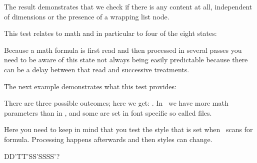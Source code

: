 \typebuffer[option=TEX]

The result demonstrates that we check if there is any content at all, independent
of dimensions or the presence of a wrapping list node.

\startlines
\getbuffer
\stoplines

\stopsectionlevel

\startsectionlevel[title={\tex{ifcramped}}]

This test relates to math and in particular to four of the eight states:

\startbuffer
{}
\stopbuffer

\typebuffer[option=TEX]

Because a math formula is first read and then processed in several passes you
need to be aware of this state not always being easily predictable because there
can be a delay between that read and successive treatments.

\startlinecorrection
\scale[s=2]{\showglyphs\getbuffer}
\stoplinecorrection

\stopsectionlevel

\startsectionlevel[title={\tex{ifmathparameter}}]

The next example demonstrates what this test provides:

\stopbuffer

\typebuffer[option=TEX]

There are three possible outcomes; here we get: \inlinebuffer. In \LUAMETATEX\ we
have more math parameters than in \LUATEX, and some are set in font specific so
called  files.

\stopsectionlevel

\startsectionlevel[title={\tex{ifmathstyle}}]

Here you need to keep in mind that you test the style that is set when \TEX\ scans for
formula. Processing happens afterwards and then styles can change.

\startbuffer
   {\ifmathstyle D\or D'\or T\or T'\or S\or S'\or SS\or SS'\else ?\fi}
\stopbuffer

